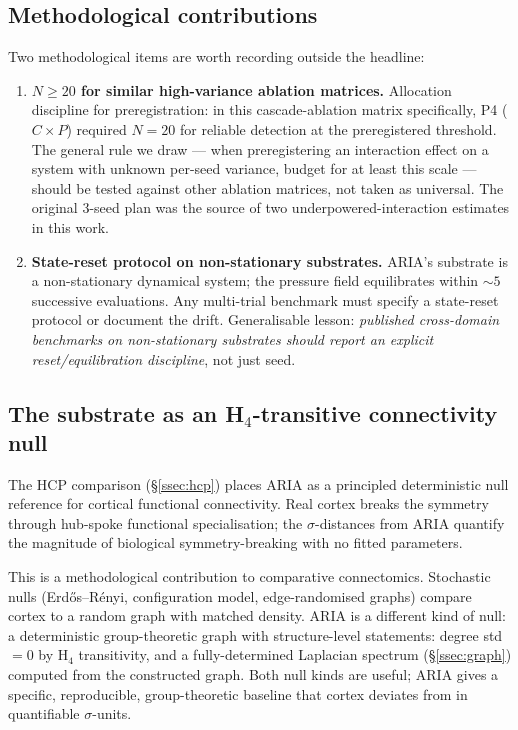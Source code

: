 \subsection{Methodological contributions}

Two methodological items are worth recording outside the headline:
\begin{enumerate}\itemsep=2pt
\item \textbf{$N\!\geq\!20$ for similar high-variance ablation matrices.}
  Allocation discipline for preregistration: in this cascade-ablation
  matrix specifically, P4 ($C\!\times\!P$) required $N\!=\!20$ for
  reliable detection at the preregistered threshold. The general
  rule we draw — when preregistering an interaction effect on a
  system with unknown per-seed variance, budget for at least this
  scale — should be tested against other ablation matrices, not
  taken as universal. The original 3-seed plan was the source of two
  underpowered-interaction estimates in this work.
\item \textbf{State-reset protocol on non-stationary substrates.}
  ARIA's substrate is a non-stationary dynamical system; the
  pressure field equilibrates within $\sim 5$ successive evaluations.
  Any multi-trial benchmark must specify a state-reset protocol or
  document the drift. Generalisable lesson: \emph{published
  cross-domain benchmarks on non-stationary substrates should report
  an explicit reset/equilibration discipline}, not just seed.
\end{enumerate}

\subsection{The substrate as an H$_4$-transitive connectivity null}

The HCP comparison (\S\ref{ssec:hcp}) places ARIA as a principled
deterministic null reference for cortical functional connectivity.
Real cortex breaks the symmetry through hub-spoke functional
specialisation; the $\sigma$-distances from ARIA quantify the
magnitude of biological symmetry-breaking with no fitted parameters.

This is a methodological contribution to comparative connectomics.
Stochastic nulls (Erd\H{o}s--R\'enyi, configuration model,
edge-randomised graphs) compare cortex to a random graph with matched
density. ARIA is a different kind of null: a deterministic
group-theoretic graph with structure-level statements: degree std
$=\!0$ by H$_4$ transitivity, and a fully-determined Laplacian
spectrum (\S\ref{ssec:graph}) computed from the constructed graph.
Both null kinds are useful; ARIA gives a specific, reproducible,
group-theoretic baseline that cortex deviates from in quantifiable
$\sigma$-units.

